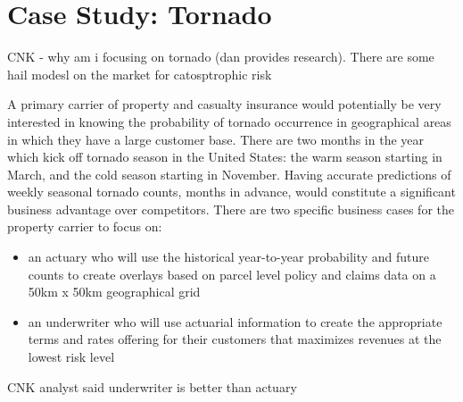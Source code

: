 

\section{Case Study: Tornado}

CNK - why am i focusing on tornado (dan provides research). There are some hail modesl on the market for catosptrophic risk 

A primary carrier of property and casualty insurance would potentially be very interested in knowing the probability of tornado occurrence in geographical areas in which they have a large customer base. There are two months in the year which kick off tornado season in the United States: the warm season starting in March, and the cold season starting in November. Having accurate predictions of weekly seasonal tornado counts, months in advance, would constitute a significant business advantage over competitors. There are two specific business cases for the property carrier to focus on:
\begin{itemize}
    \item an actuary who will use the historical year-to-year probability and future counts to create overlays based on parcel level policy and claims data on a 50km x 50km geographical grid
    \item an underwriter who will use actuarial information to create the appropriate terms and rates offering for their customers that maximizes revenues at the lowest risk level
\end{itemize}

CNK analyst said underwriter is better than actuary

